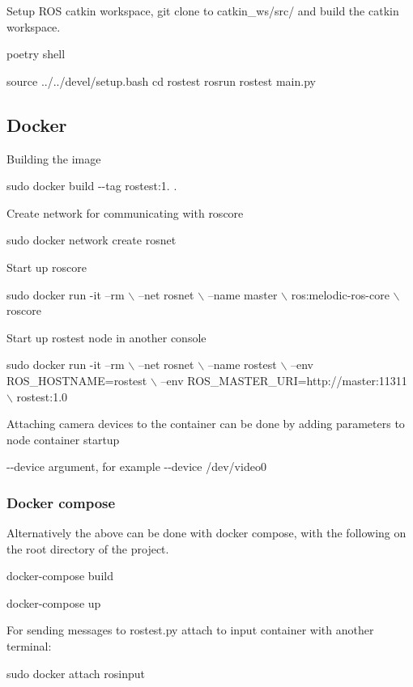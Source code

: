 Setup R\+OS catkin workspace, {\ttfamily git clone} to {\ttfamily catkin\+\_\+ws/src/} and build the catkin workspace.

{\ttfamily poetry shell} 
\begin{DoxyCode}
source ../../devel/setup.bash
cd rostest
rosrun rostest main.py
\end{DoxyCode}


\subsection*{Docker}

Building the image

{\ttfamily sudo docker build -\/-\/tag rostest\+:1. .}

Create network for communicating with roscore

{\ttfamily sudo docker network create rosnet}

Start up roscore 
\begin{DoxyCode}
sudo docker run -it --rm \(\backslash\)
--net rosnet \(\backslash\)
--name master \(\backslash\)
ros:melodic-ros-core \(\backslash\)
roscore
\end{DoxyCode}
 Start up rostest node in another console 
\begin{DoxyCode}
sudo docker run -it --rm \(\backslash\)
    --net rosnet \(\backslash\)
    --name rostest \(\backslash\)
    --env ROS\_HOSTNAME=rostest \(\backslash\)
    --env ROS\_MASTER\_URI=http://master:11311 \(\backslash\)
    rostest:1.0
\end{DoxyCode}
 Attaching camera devices to the container can be done by adding parameters to node container startup

{\ttfamily -\/-\/device} argument, for example {\ttfamily -\/-\/device /dev/video0}

\subsubsection*{Docker compose}

Alternatively the above can be done with docker compose, with the following on the root directory of the project.

{\ttfamily docker-\/compose build}

{\ttfamily docker-\/compose up}

For sending messages to rostest.\+py attach to input container with another terminal\+:

{\ttfamily sudo docker attach rosinput}

